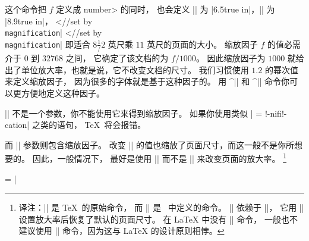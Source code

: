 这个命令把 $f$ 定义成 \<number> 的同时，
也会定义 |\hsize| 为 |6.5true in|，|\vsize| 为 |8.9true in|，
^^|\hsize//set by {\tt\\magnification}|
^^|\vsize//set by {\tt\\magnification}|
即适合 $8 \frac1/2$ 英尺乘 $11$ 英尺的页面的大小。
缩放因子 $f$ 的值必需介于 $0$ 到 $32768$ 之间，
它确定了该文档的为 $f/1000$。
因此缩放因子为 $1000$ 就给出了单位放大率，也就是说，它不改变文档的尺寸。
我们习惯使用 $1.2$ 的幂次值来定义缩放因子，
因为很多的字体就是基于这种因子的。
用 ^|\magstep| 和 ^|\magstephalf| 命令你可以更方便地定义这种因子。

|\magnification| 不是一个参数，你不能使用它来得到缩放因子。
如果你使用类似 | = \mag!-nifi!-cation| 之类的语句，
\TeX\ 将会报错。

而 |\mag| 参数则包含缩放因子。
改变 |\mag| 的值也缩放了页面尺寸，而这一般不是你所想要的。
因此，一般情况下，
最好是使用 |\magnification| 而不是 |\mag| 来改变页面的放大率。%
\footnote{译注：|\mag| 是 \TeX\ 的原始命令，
而 |\magnification| 是 \plainTeX\ 中定义的命令。
|\magnification| 依赖于 |\mag|，
它用 |\mag| 设置放大率后恢复了默认的页面尺寸。
在 LaTeX 中没有 |\magnification| 命令，
一般也不建议使用 |\mag| 命令，因为这与 LaTeX 的设计原则相悖。
}

\example
\magnification = 
|
\endexample
\enddesc

